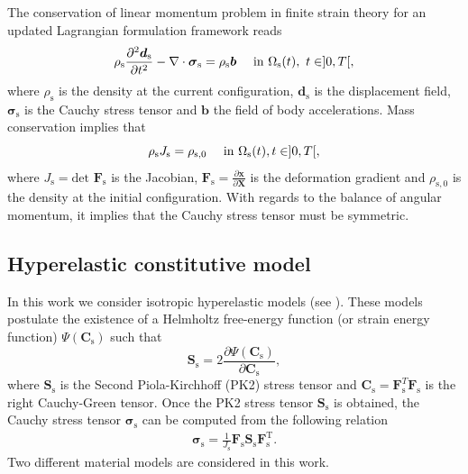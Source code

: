 \documentclass[11pt,english]{article}
\begin{document}
The conservation of linear momentum problem in finite strain theory for an updated Lagrangian formulation framework reads
\begin{equation*}
\rho_\mathrm{s}\frac{\partial^{2}\boldsymbol{d}_{\mathrm{s}}}{\partial t^2} -\nabla \cdot  \boldsymbol{\sigma}_{\mathrm{s}} = \rho_{\mathrm{s}} \boldsymbol{b} \quad\text{ in } \ensuremath{\Omega}_{\rm{s}}(t), ~ t\in]0,T[,
 \label{eq:linear_momentum_u}
 \end{equation*}
where $\rho_{\mathrm{s}}$ is the density at the current configuration, $\boldsymbol{d}_{\mathrm{s}}$ is the displacement field,  $\boldsymbol{\sigma}_{\mathrm{s}}$ is the Cauchy stress tensor and $\boldsymbol{b}$ the field of body accelerations. Mass conservation implies that
 \begin{equation*}
     \rho_{\mathrm{s}} J_{\mathrm{s}} = \rho_{\mathrm{s},0}\quad \text{ in } \ensuremath{\Omega}_{\rm{s}}(t), t\in]0,T[,
    \label{eq:mass_conservation}
\end{equation*}
where $J_{\mathrm{s}} = \text{det }\boldsymbol{F}_{\mathrm{s}}$ is the Jacobian, $\boldsymbol{F}_{\mathrm{s}}=\frac{\partial \boldsymbol{x}}{\partial \boldsymbol{X}}$ is the deformation gradient and $\rho_{\mathrm{s},0}$ is the density at the initial configuration. With regards to the balance of angular momentum, it implies that the Cauchy stress tensor must be symmetric. 

\subsection{Hyperelastic constitutive model\label{subsec:hyperelasticity}}

In this work we consider isotropic hyperelastic models (see \cite{Holzapfel,Belytschko,Bonet}). These models postulate the existence of a Helmholtz free-energy function (or strain energy function) $\Psi \left (\boldsymbol{C}_{\mathrm{s}} \right )$  such that
\begin{equation}
    \boldsymbol{S}_{\mathrm{s}}=2\frac{\partial \Psi \left( \boldsymbol{C}_{\mathrm{s}} \right)}{\partial \boldsymbol{C}_{\mathrm{s}}},
    \label{eq:hyperelastic_strain_energy_function_definition}
\end{equation}
where $\boldsymbol{S}_\mathrm{s}$ is the Second Piola-Kirchhoff (PK2) stress tensor and $\boldsymbol{C}_{\mathrm{s}}=\boldsymbol{F}_{\mathrm{s}}^T\boldsymbol{F}_{\mathrm{s}}$ is the right Cauchy-Green tensor. Once the PK2 stress tensor $\boldsymbol{S}_{\mathrm{s}}$ is obtained, the Cauchy stress tensor $\boldsymbol{\sigma}_{\mathrm{s}}$ can be computed from the following relation
\begin{align*}
    \boldsymbol{\sigma}_{\mathrm{s}} = \frac{1}{J_{\mathrm{s}}} \boldsymbol{F}_{\mathrm{s}} \boldsymbol{S}_{\mathrm{s}} \boldsymbol{F}_{\mathrm{s}}^\mathrm{T}.
    \label{eq:relation_between_stresses}
\end{align*}
Two different material models are considered in this work.
\end{document}
